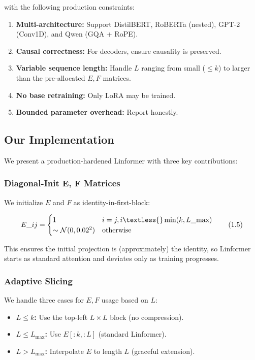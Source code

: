 with the following production constraints:

\begin{enumerate}
\item \textbf{Multi-architecture:} Support DistilBERT, RoBERTa (nested), GPT-2
  (Conv1D), and Qwen (GQA + RoPE).
\item \textbf{Causal correctness:} For decoders, ensure causality is preserved.
\item \textbf{Variable sequence length:} Handle $L$ ranging from small ($\le$$k$) to
  larger than the pre-allocated $E, F$ matrices.
\item \textbf{No base retraining:} Only LoRA may be trained.
\item \textbf{Bounded parameter overhead:} Report honestly.

\end{enumerate}
\subsection{Our Implementation}

We present a production-hardened Linformer with three key contributions:

\subsubsection{Diagonal-Init E, F Matrices}

We initialize $E$ and $F$ as identity-in-first-block:

\[
E\_{ij} = \begin{cases} 1 & i = j, i \textless{} \min(k, L\_\text{max}) \\ \sim \mathcal{N}(0, 0.02^2) & \text{otherwise} \end{cases}
\tag{1.5}
\]

This ensures the initial projection is (approximately) the identity, so 
Linformer starts as standard attention and deviates only as training 
progresses.

\subsubsection{Adaptive Slicing}

We handle three cases for $E, F$ usage based on $L$:

\begin{itemize}
\item \textbf{$L \leq k$:} Use the top-left $L \times L$ block (no compression).
\item \textbf{$L \leq L_\text{max}$:} Use $E[:k, :L]$ (standard Linformer).
\item \textbf{$L > L_\text{max}$:} Interpolate $E$ to length $L$ (graceful extension).

\end{itemize}
